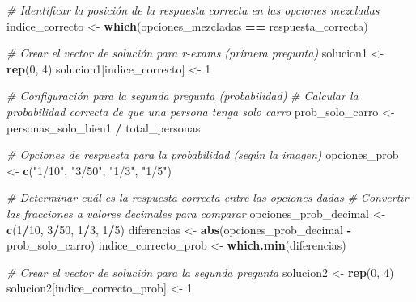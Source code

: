 \documentclass[
]{article}
\newenvironment{Shaded}{\begin{snugshade}}{\end{snugshade}}
\newcommand{\CommentTok}[1]{\textcolor[rgb]{0.56,0.35,0.01}{\textit{#1}}}
\newcommand{\DecValTok}[1]{\textcolor[rgb]{0.00,0.00,0.81}{#1}}
\newcommand{\FunctionTok}[1]{\textcolor[rgb]{0.13,0.29,0.53}{\textbf{#1}}}
\newcommand{\NormalTok}[1]{#1}
\newcommand{\OtherTok}[1]{\textcolor[rgb]{0.56,0.35,0.01}{#1}}
\newcommand{\SpecialCharTok}[1]{\textcolor[rgb]{0.81,0.36,0.00}{\textbf{#1}}}
\newcommand{\StringTok}[1]{\textcolor[rgb]{0.31,0.60,0.02}{#1}}
\begin{document}
\begin{Shaded}
\begin{Highlighting}[]
\CommentTok{\# Identificar la posición de la respuesta correcta en las opciones mezcladas}
\NormalTok{indice\_correcto }\OtherTok{\textless{}{-}} \FunctionTok{which}\NormalTok{(opciones\_mezcladas }\SpecialCharTok{==}\NormalTok{ respuesta\_correcta)}

\CommentTok{\# Crear el vector de solución para r{-}exams (primera pregunta)}
\NormalTok{solucion1 }\OtherTok{\textless{}{-}} \FunctionTok{rep}\NormalTok{(}\DecValTok{0}\NormalTok{, }\DecValTok{4}\NormalTok{)}
\NormalTok{solucion1[indice\_correcto] }\OtherTok{\textless{}{-}} \DecValTok{1}

\CommentTok{\# Configuración para la segunda pregunta (probabilidad)}
\CommentTok{\# Calcular la probabilidad correcta de que una persona tenga solo carro}
\NormalTok{prob\_solo\_carro }\OtherTok{\textless{}{-}}\NormalTok{ personas\_solo\_bien1 }\SpecialCharTok{/}\NormalTok{ total\_personas}

\CommentTok{\# Opciones de respuesta para la probabilidad (según la imagen)}
\NormalTok{opciones\_prob }\OtherTok{\textless{}{-}} \FunctionTok{c}\NormalTok{(}\StringTok{"1/10"}\NormalTok{, }\StringTok{"3/50"}\NormalTok{, }\StringTok{"1/3"}\NormalTok{, }\StringTok{"1/5"}\NormalTok{)}

\CommentTok{\# Determinar cuál es la respuesta correcta entre las opciones dadas}
\CommentTok{\# Convertir las fracciones a valores decimales para comparar}
\NormalTok{opciones\_prob\_decimal }\OtherTok{\textless{}{-}} \FunctionTok{c}\NormalTok{(}\DecValTok{1}\SpecialCharTok{/}\DecValTok{10}\NormalTok{, }\DecValTok{3}\SpecialCharTok{/}\DecValTok{50}\NormalTok{, }\DecValTok{1}\SpecialCharTok{/}\DecValTok{3}\NormalTok{, }\DecValTok{1}\SpecialCharTok{/}\DecValTok{5}\NormalTok{)}
\NormalTok{diferencias }\OtherTok{\textless{}{-}} \FunctionTok{abs}\NormalTok{(opciones\_prob\_decimal }\SpecialCharTok{{-}}\NormalTok{ prob\_solo\_carro)}
\NormalTok{indice\_correcto\_prob }\OtherTok{\textless{}{-}} \FunctionTok{which.min}\NormalTok{(diferencias)}

\CommentTok{\# Crear el vector de solución para la segunda pregunta}
\NormalTok{solucion2 }\OtherTok{\textless{}{-}} \FunctionTok{rep}\NormalTok{(}\DecValTok{0}\NormalTok{, }\DecValTok{4}\NormalTok{)}
\NormalTok{solucion2[indice\_correcto\_prob] }\OtherTok{\textless{}{-}} \DecValTok{1}
\end{Highlighting}
\end{Shaded}
\end{document}
